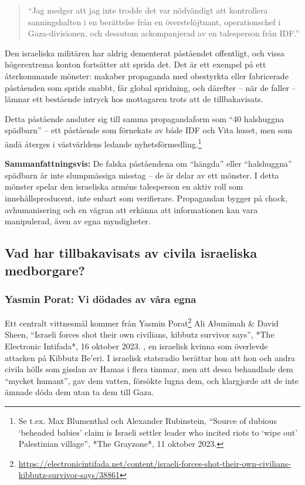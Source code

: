 \documentclass[12pt]{article}
\begin{document}
\begin{quote}
    “Jag medger att jag inte trodde det var nödvändigt att kontrollera sanningshalten i en berättelse från en överstelöjtnant, operationschef i Gaza-divisionen, och dessutom ackompanjerad av en talesperson från IDF.”
\end{quote}

Den israeliska militären har aldrig dementerat påståendet offentligt, och vissa högerextrema konton fortsätter att sprida det. Det är ett exempel på ett återkommande mönster: makaber propaganda med obestyrkta eller fabricerade påståenden som sprids snabbt, får global spridning, och därefter – när de faller – lämnar ett bestående intryck hos mottagaren trots att de tillbakavisats.

Detta påstående ansluter sig till samma propagandaform som “40 halshuggna spädbarn” – ett påstående som förnekats av både IDF och Vita huset, men som ändå återges i västvärldens ledande nyhetsförmedling.\footnote{Se t.ex. Max Blumenthal och Alexander Rubinstein, “Source of dubious ‘beheaded babies’ claim is Israeli settler leader who incited riots to ‘wipe out’ Palestinian village”, *The Grayzone*, 11 oktober 2023.}

\textbf{Sammanfattningsvis:} De falska påståendena om “hängda” eller “halshuggna” spädbarn är inte slumpmässiga misstag – de är delar av ett mönster. I detta mönster spelar den israeliska arméns talesperson en aktiv roll som innehållsproducent, inte enbart som verifierare. Propagandan bygger på chock, avhumanisering och en vägran att erkänna att informationen kan vara manipulerad, även av egna myndigheter.


\subsection*{Vad har tillbakavisats av civila israeliska medborgare?}

\subsubsection*{Yasmin Porat: Vi dödades av våra egna}
Ett centralt vittnesmål kommer från Yasmin Porat\footnote{\url{https://electronicintifada.net/content/israeli-forces-shot-their-own-civilians-kibbutz-survivor-says/38861}} Ali Abunimah \& David Sheen, “Israeli forces shot their own civilians, kibbutz survivor says”, *The Electronic Intifada*, 16 oktober 2023.
, en israelisk kvinna som överlevde attacken på Kibbutz Be’eri. I israelisk statsradio berättar hon att hon och andra civila hölls som gisslan av Hamas i flera timmar, men att dessa behandlade dem “mycket humant”, gav dem vatten, försökte lugna dem, och klargjorde att de inte ämnade döda dem utan ta dem till Gaza.
\end{document}
